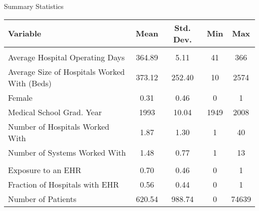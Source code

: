 
\footnotesize
\caption{\footnotesize Summary Statistics}
\vspace{-2mm}
\begin{tabular}[t]{lcccc}
\toprule
Variable & Mean & Std. Dev. & Min & Max\\
\midrule
\addlinespace[0.3em]
\multicolumn{5}{l}{\textbf{Static}}\\
\hspace{1em}Average Hospital Operating Days  & 364.89 & 5.11 & 41 & 366\\
\hspace{1em}Average Size of Hospitals Worked With (Beds)  & 373.12 & 252.40 & 10 & 2574\\
\hspace{1em}Female  & 0.31 & 0.46 & 0 & 1\\
\hspace{1em}Medical School Grad. Year  & 1993 & 10.04 & 1949 & 2008\\
\hspace{1em}Number of Hospitals Worked With  & 1.87 & 1.30 & 1 & 40\\
\hspace{1em}Number of Systems Worked With  & 1.48 & 0.77 & 1 & 13\\
\addlinespace[0.3em]
\multicolumn{5}{l}{\textbf{Dynamic}}\\
\hspace{1em}Exposure to an EHR  & 0.70 & 0.46 & 0 & 1\\
\hspace{1em}Fraction of Hospitals with EHR  & 0.56 & 0.44 & 0 & 1\\
\hspace{1em}Number of Patients & 620.54 & 988.74 & 0 & 74639\\
\bottomrule
\end{tabular}
